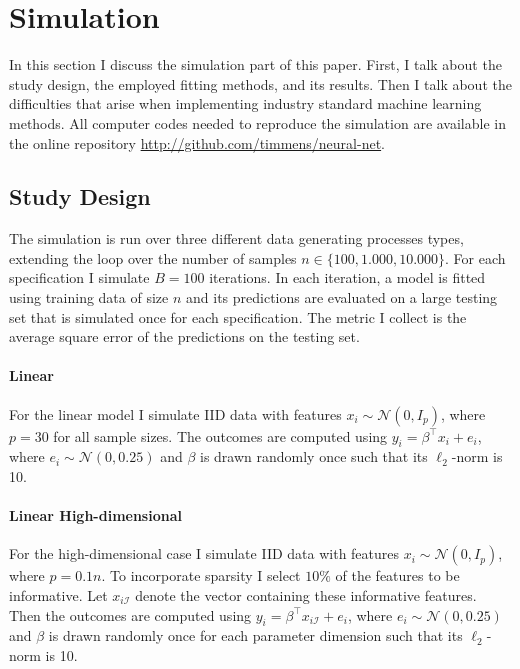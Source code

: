 \section{Simulation}
\label{seq:simulation}

In this section I discuss the simulation part of this paper. First, I talk about the
study design, the employed fitting methods, and its results. Then I talk about the
difficulties that arise when implementing industry standard machine learning methods.
All computer codes needed to reproduce the simulation are available in the online
repository \url{http://github.com/timmens/neural-net}.

\subsection{Study Design}

The simulation is run over three different data generating processes types, extending
the loop over the number of samples $n \in \{100, 1.000, 10.000\}$. For each
specification I simulate $B = 100$ iterations. In each iteration, a model is fitted
using training data of size $n$ and its predictions are evaluated on a large testing set
that is simulated once for each specification. The metric I collect is the average
square error of the predictions on the testing set.

\paragraph{Linear}

For the linear model I simulate IID data with features $x_i \sim \mathcal{N}(0, I_p)$,
where $p = 30$ for all sample sizes. The outcomes are computed using $y_i = \beta^\top
x_i + e_i$, where $e_i \sim \mathcal{N}(0, 0.25)$ and $\beta$ is drawn randomly once
such that its $\ell_2$-norm is 10.


\paragraph{Linear High-dimensional}

For the high-dimensional case I simulate IID data with features $x_i \sim \mathcal{N}(0,
I_p)$, where $p = 0.1 n$. To incorporate sparsity I select $10\%$ of the features to be
informative. Let $x_{i\mathcal{I}}$ denote the vector containing these informative
features. Then the outcomes are computed using $y_i = \beta^\top x_{i\mathcal{I}} +
e_i$, where $e_i \sim \mathcal{N}(0, 0.25)$ and $\beta$ is drawn randomly once for each
parameter dimension such that its $\ell_2$-norm is 10.

